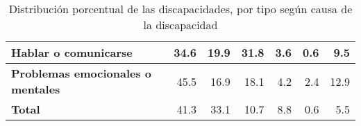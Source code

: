 \begin{table}[]
{\begin{tabular}{lllllll}
\multicolumn{1}{|m{3cm}|}{\textbf{Hablar o comunicarse}}
& \multicolumn{1}{r|}{34.6}
& \multicolumn{1}{r|}{19.9}
& \multicolumn{1}{r|}{31.8}
& \multicolumn{1}{r|}{3.6}
& \multicolumn{1}{r|}{0.6}
& \multicolumn{1}{r|}{9.5} \\ \hline

\multicolumn{1}{|m{3cm}|}{\textbf{Problemas emocionales o mentales}}
& \multicolumn{1}{r|}{45.5}
& \multicolumn{1}{r|}{16.9}
& \multicolumn{1}{r|}{18.1}
& \multicolumn{1}{r|}{4.2}
& \multicolumn{1}{r|}{2.4}
& \multicolumn{1}{r|}{12.9} \\ \hline

\multicolumn{1}{|m{3cm}|}{\textbf{Total}}
& \multicolumn{1}{r|}{41.3}
& \multicolumn{1}{r|}{33.1}
& \multicolumn{1}{r|}{10.7}
& \multicolumn{1}{r|}{8.8}
& \multicolumn{1}{r|}{0.6}
& \multicolumn{1}{r|}{5.5} \\ \hline
\end{tabular}
}
\caption{Distribuci\'on porcentual de las discapacidades, por tipo seg\'un
 causa de la discapacidad\cite{INEGI2014}}
\label{discapacidadCausa}
\end{table}
